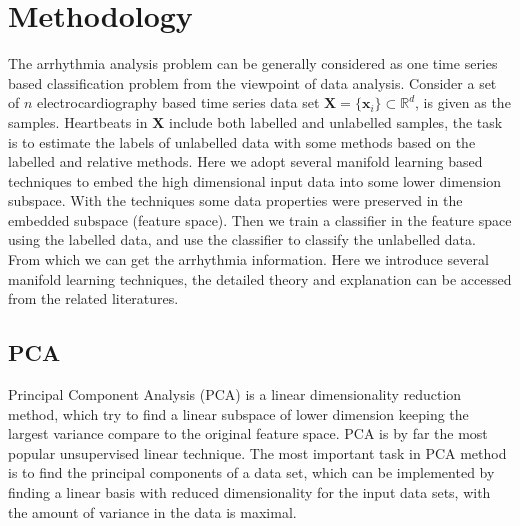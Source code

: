 \documentclass[journal]{IEEEtran}
\begin{document}


%
%

\section{Methodology}
The arrhythmia analysis problem can be generally considered as one time series based classification problem from the viewpoint of data analysis.
Consider a set of $n$ electrocardiography based time series data set $\boldsymbol{X} = \{\boldsymbol{x}_i\} \subset \mathbb{R}^d$, is given as the samples.
Heartbeats in $\boldsymbol{X}$ include both labelled and unlabelled samples, the task is to estimate the labels of unlabelled data with some methods based on the labelled and relative methods.
Here we adopt several manifold learning based techniques to embed the high dimensional input data into some lower dimension subspace. 
With the techniques some data properties were preserved in the embedded subspace (feature space).
Then we train a classifier in the feature space using the labelled data, and use the classifier to classify the unlabelled data. From which we can get the arrhythmia information. 
Here we introduce several manifold learning techniques, the detailed theory and explanation can be accessed from the related literatures.


%
%

\subsection{PCA}
Principal Component Analysis (PCA) is a linear dimensionality reduction method, which try to find a linear subspace of lower dimension keeping the largest variance compare to the original feature space.
PCA is by far the most popular unsupervised linear technique.
The most important task in PCA method is to find the principal components of a data set, which can be implemented by finding a linear basis with reduced dimensionality for the input data sets, with the amount of variance in the data is maximal.
\end{document}
